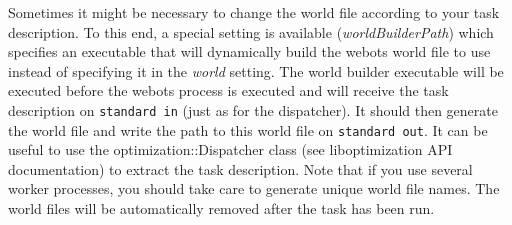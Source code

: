 \documentclass{report}
\begin{document}
Sometimes it might be necessary to change the world file according to your task
description. To this end, a special setting is available (\textit{worldBuilderPath})
which specifies an executable that will dynamically build the webots world
file to use instead of specifying it in the \textit{world} setting. The
world builder executable will be executed before the webots process is executed
and will receive the task description on \verb!standard in!
(just as for the dispatcher). It should then generate the world file and
write the path to this world file on \verb!standard out!. It can be useful
to use the optimization::Dispatcher class (see liboptimization API
documentation) to extract the task description. Note that if you use several
worker processes, you should take care to generate unique world file names.
The world files will be automatically removed after the task has been run.
\end{document}
